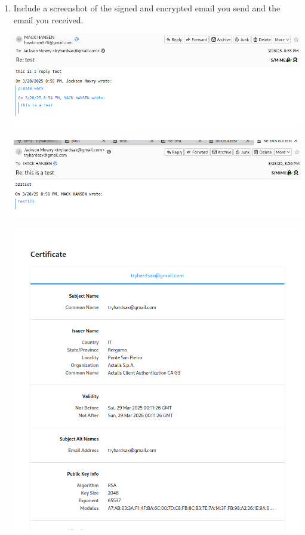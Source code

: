 \documentclass[11pt]{article}
\begin{document}
\begin{enumerate}
\begin{itemize}
\end{itemize}
\item Include a screenshot of the signed and encrypted email you send and the email you received.
\begin{center}
\includegraphics[width=.9\linewidth]{screenshot-1743277577_901x297.png}
\end{center}
\begin{center}
\includegraphics[width=.9\linewidth]{screenshot-1743277613_897x242.png}
\end{center}
\begin{center}
\includegraphics[width=.9\linewidth]{screenshot-1743277622_903x950.png}

\end{center}
\end{enumerate}
\end{document}
